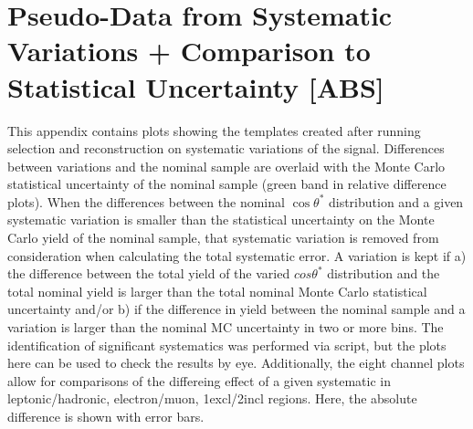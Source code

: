 \clearpage
\section{Pseudo-Data from Systematic Variations + Comparison to Statistical Uncertainty [ABS]}
\label{app:systTemplates_abs}
This appendix contains plots showing the templates created after running selection and reconstruction on systematic variations of the \ttbar signal. Differences between variations and the nominal sample are overlaid with the Monte Carlo statistical uncertainty of the nominal sample (green band in relative difference plots). When the differences between the nominal $\cos\theta^*$ distribution and a given systematic variation is smaller than the statistical uncertainty on the Monte Carlo yield of the nominal sample, that systematic variation is removed from consideration when calculating the total systematic error. A variation is kept if a) the difference between the total yield of the varied $cos\theta^*$ distribution and the total nominal yield is larger than the total nominal Monte Carlo statistical uncertainty and/or b) if the difference in yield between the nominal sample and a variation is larger than the nominal MC uncertainty in two or more bins. The identification of significant systematics was performed via script, but the plots here can be used to check the results by eye. Additionally, the eight channel plots allow for comparisons of the differeing effect of a given systematic in leptonic/hadronic, electron/muon, 1excl/2incl regions. Here, the absolute difference is shown with error bars.

